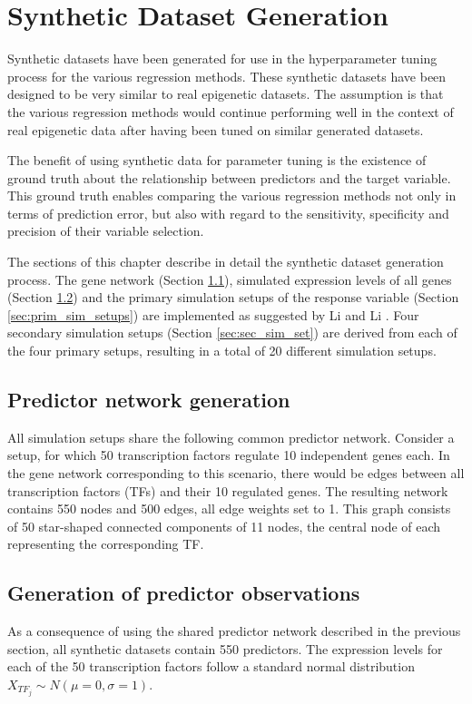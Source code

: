 \chapter{Synthetic Dataset Generation} \label{sec:datagen}
Synthetic datasets have been generated for use in the hyperparameter tuning process for the various regression methods. These synthetic datasets have been designed to be very similar to real epigenetic datasets. The assumption is that the various regression methods would continue performing well in the context of real epigenetic data after having been tuned on similar generated datasets.

The benefit of using synthetic data for parameter tuning is the existence of ground truth about the relationship between predictors and the target variable. This ground truth enables comparing the various regression methods not only in terms of prediction error, but also with regard to the sensitivity, specificity and precision of their variable selection.

The sections of this chapter describe in detail the synthetic dataset generation process. The gene network (Section \ref{sec:pred_net}), simulated expression levels of all genes (Section \ref{sec:obs_gen}) and the primary simulation setups of the response variable (Section \ref{sec:prim_sim_setups}) are implemented as suggested by Li and Li \cite{li2008network}. Four secondary simulation setups (Section \ref{sec:sec_sim_set}) are derived from each of the four primary setups, resulting in a total of 20 different simulation setups.


\section{Predictor network generation} \label{sec:pred_net}
All simulation setups share the following common predictor network. Consider a setup, for which 50 transcription factors regulate 10 independent genes each. In the gene network corresponding to this scenario, there would be edges between all transcription factors (TFs) and their 10 regulated genes. The resulting network contains 550 nodes and 500 edges, all edge weights set to 1. This graph consists of 50 star-shaped connected components of 11 nodes, the central node of each representing the corresponding TF. 


\section{Generation of predictor observations} \label{sec:obs_gen}
As a consequence of using the shared predictor network described in the previous section, all synthetic datasets contain 550 predictors. The expression levels for each of the 50 transcription factors follow a standard normal distribution $X_{TF_j} \sim N(\mu = 0, \sigma = 1)$. 

